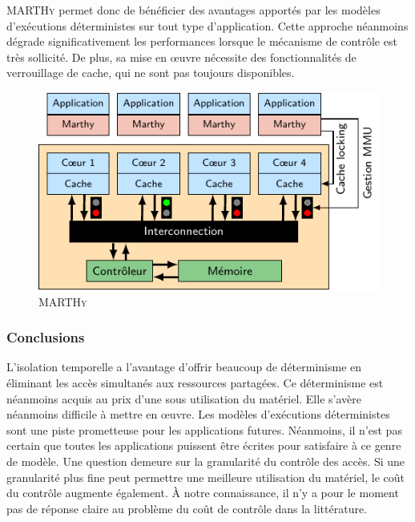 \textsc{MARTHy} permet donc de bénéficier des avantages apportés par les modèles d'exécutions déterministes sur tout type d'application.
Cette approche néanmoins dégrade significativement les performances lorsque le mécanisme de contrôle est très sollicité.
De plus, sa mise en œuvre nécessite des fonctionnalités de verrouillage de cache, qui ne sont pas toujours disponibles.


\begin{figure}
	\centering
	\includegraphics[width=0.75\linewidth]{graphics/figures/marthy.pdf}
	\caption{\label{fig:marthy}\textsc{MARTHy}}
\end{figure}

\subsubsection{Conclusions}

L'isolation temporelle a l'avantage d'offrir beaucoup de déterminisme en éliminant les accès simultanés aux ressources partagées.
Ce déterminisme est néanmoins acquis au prix d'une sous utilisation du matériel.
Elle s'avère néanmoins difficile à mettre en œuvre.
Les modèles d'exécutions déterministes sont une piste prometteuse pour les applications futures.
Néanmoins, il n'est pas certain que toutes les applications puissent être écrites pour satisfaire à ce genre de modèle.
Une question demeure sur la granularité du contrôle des accès.
Si une granularité plus fine peut permettre une meilleure utilisation du matériel, le coût du contrôle augmente également.
À notre connaissance, il n'y a pour le moment pas de réponse claire au problème du coût de contrôle dans la littérature.


